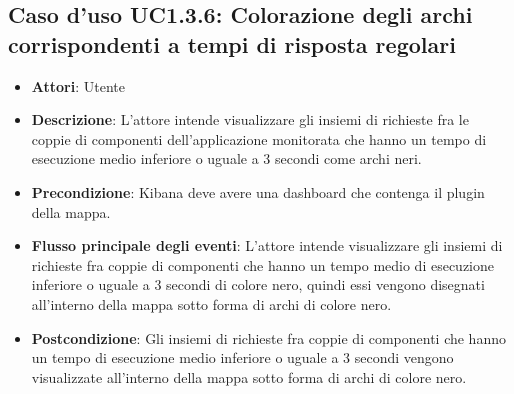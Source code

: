 \subsection{Caso d'uso UC1.3.6: Colorazione degli archi corrispondenti a tempi di risposta regolari}
\begin{itemize}
	\item \textbf{Attori}: Utente
	\item \textbf{Descrizione}: L'attore intende visualizzare gli insiemi di richieste fra le coppie di componenti dell'applicazione monitorata che hanno un tempo di esecuzione medio inferiore o uguale a 3 secondi come archi neri.
	\item \textbf{Precondizione}: Kibana deve avere una dashboard che contenga il plugin della mappa.
	\item \textbf{Flusso principale degli eventi}: L'attore intende visualizzare gli insiemi di richieste fra coppie di componenti che hanno un tempo medio di esecuzione inferiore o uguale a 3 secondi di colore nero, quindi essi vengono disegnati all'interno della mappa sotto forma di archi di colore nero.
	\item \textbf{Postcondizione}: Gli insiemi di richieste fra coppie di componenti che hanno un tempo di esecuzione medio inferiore o uguale a 3 secondi vengono visualizzate all'interno della mappa sotto forma di archi di colore nero.
\end{itemize}
